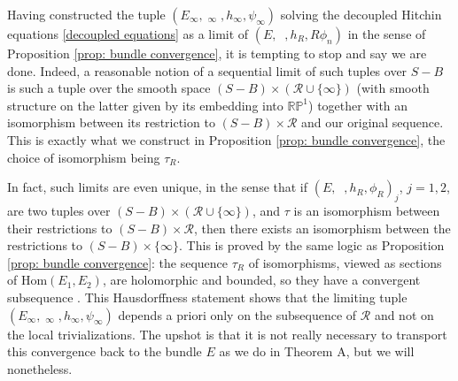 \documentclass[10pt]{amsart}
\DeclareMathOperator{\dbar}{\overline{\partial}}
\theoremstyle{definition}
\begin{document}
Having constructed the tuple $(E_\infty, \dbar_\infty , h_\infty, \psi_\infty)$ solving the decoupled Hitchin equations \eqref{decoupled equations} as a limit of $(E, \dbar, h_R, R\phi_n)$ in the sense of Proposition \ref{prop: bundle convergence}, it is tempting to stop and say we are done. Indeed, a reasonable notion of a sequential limit of such tuples over $S-B$ is such a tuple over the smooth space $(S - B) \times (\mathcal{R} \cup \{\infty\})$ (with smooth structure on the latter given by its embedding into $\mathbb{RP}^1$) together with an isomorphism between its restriction to $(S-B) \times \mathcal{R}$ and our original sequence. This is exactly what we construct in Proposition \ref{prop: bundle convergence}, the choice of isomorphism being $\tau_R$.

In fact, such limits are even unique, in the sense that if $(E, \dbar, h_R, \phi_R)_j$, $j = 1,2$, are two tuples over $(S - B) \times (\mathcal{R} \cup \{\infty\})$, and $\tau$ is an isomorphism between their restrictions to $(S-B) \times \mathcal{R}$, then there exists an isomorphism between the restrictions to $(S-B) \times \{\infty\}$. This is proved by the same logic as Proposition \ref{prop: bundle convergence}: the sequence $\tau_R$ of isomorphisms, viewed as sections of $\mathrm{Hom}(E_1, E_2)$, are holomorphic and bounded, so they have a convergent subsequence \cite[Prop 2.3.15]{DK}. This Hausdorffness statement shows that the limiting tuple $(E_\infty, \dbar_\infty , h_\infty, \psi_\infty)$ depends a priori only on the subsequence of $\mathcal{R}$ and not on the local trivializations. The upshot is that it is not really necessary to transport this convergence back to the bundle $E$ as we do in Theorem A, but we will nonetheless. 
\end{document}
